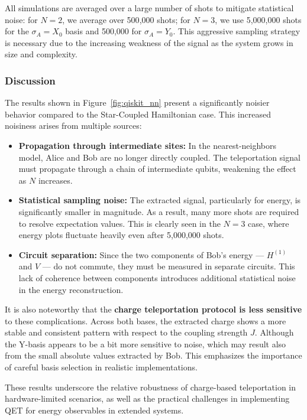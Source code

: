 All simulations are averaged over a large number of shots to mitigate statistical noise: for \( N = 2 \), we average over 500{,}000 shots; for \( N = 3 \), we use 5{,}000{,}000 shots for the \( \sigma_A = X_0 \) basis and 500{,}000 for \( \sigma_A = Y_0 \). This aggressive sampling strategy is necessary due to the increasing weakness of the signal as the system grows in size and complexity.

\subsubsection*{Discussion}

The results shown in Figure~\ref{fig:qiskit_nn} present a significantly noisier behavior compared to the Star-Coupled Hamiltonian case. This increased noisiness arises from multiple sources:

\begin{itemize}
    \item \textbf{Propagation through intermediate sites:} In the nearest-neighbors model, Alice and Bob are no longer directly coupled. The teleportation signal must propagate through a chain of intermediate qubits, weakening the effect as \( N \) increases.
    \item \textbf{Statistical sampling noise:} The extracted signal, particularly for energy, is significantly smaller in magnitude. As a result, many more shots are required to resolve expectation values. This is clearly seen in the \( N = 3 \) case, where energy plots fluctuate heavily even after 5{,}000{,}000 shots.
    \item \textbf{Circuit separation:} Since the two components of Bob's energy — \( H^{(1)} \) and \( V \) — do not commute, they must be measured in separate circuits. This lack of coherence between components introduces additional statistical noise in the energy reconstruction.
\end{itemize}

It is also noteworthy that the \textbf{charge teleportation protocol is less sensitive} to these complications. Across both bases, the extracted charge shows a more stable and consistent pattern with respect to the coupling strength \( J \). Although the Y-basis appears to be a bit more sensitive to noise, which may result also from the small absolute values extracted by Bob. This emphasizes the importance of careful basis selection in realistic implementations.

These results underscore the relative robustness of charge-based teleportation in hardware-limited scenarios, as well as the practical challenges in implementing QET for energy observables in extended systems.

